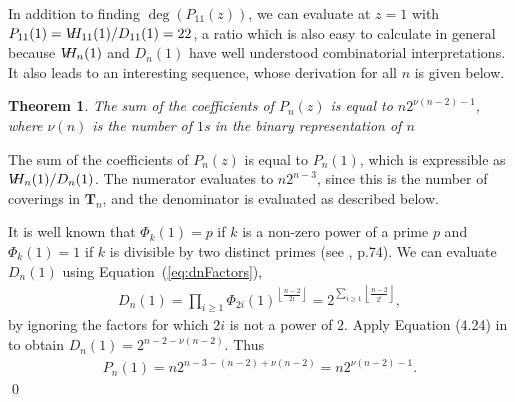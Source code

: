\documentclass[12pt]{amsart}
\newtheorem{theorem}{Theorem}
\newcommand{\eref}[1]{Equation~(\ref{eq:#1})}
\newcommand\flr[2]{\left\lfloor \frac{#1}{#2} \right\rfloor}
\newcommand{\Tn}[1]{\mathbf T_{#1}}
\newcommand{\vh}{V\hspace{-5pt}H}
\begin{document}

In addition to finding $\deg(P_{11}(z))$, we can evaluate at $z=1$
with $P_{11}(1) = \vh_{11}(1)/D_{11}(1) = 22$, a ratio which is also
easy to calculate in general because $\vh_{n}(1)$ and $D_n(1)$ have
well understood combinatorial interpretations. It also leads to an
interesting sequence, whose derivation for all $n$ is given below.


\begin{theorem}
  \label{thm:nu}
  The sum of the coefficients of $P_n(z)$ is equal to
  $n2^{\nu(n-2)-1}$, where $\nu(n)$ is the number of $1$s in the
  binary representation of $n$
\end{theorem}
\proof The sum of the coefficients of $P_n(z)$ is equal to $P_n(1)$,
which is expressible as $\vh_{n}(1)/D_{n}(1)$.  The numerator
evaluates to $n2^{n-3}$, since this is the number of coverings in
$\Tn{n}$, and the denominator is evaluated as described below.

It is well known that $\Phi_{k}(1) = p$ if $k$ is a non-zero power of
a prime $p$ and $\Phi_k(1) = 1$ if $k$ is divisible by two distinct
primes (see \cite{Lang1970}, p.74). We can evaluate $D_n(1)$ using
\eref{dnFactors},
\begin{align*}
  D_n(1)= \prod_{i\ge 1} \Phi_{2i}(1)^{\flr{n-2}{2i}} =  2^{\sum_{i\ge 1}\flr{n-2}{2^i}},
\end{align*}
by ignoring the factors for which $2i$ is not a power of $2$.  Apply
Equation (4.24) in \cite{GrahamKnuthPatashnik1994} to obtain $D_n(1) =
2^{n-2 - \nu(n-2)}$. Thus
\begin{align*}
  P_n(1) = n2^{n-3 - (n-2) + \nu(n-2)} = n 2^{\nu(n-2)-1}.
\end{align*}\qed
\end{document}
